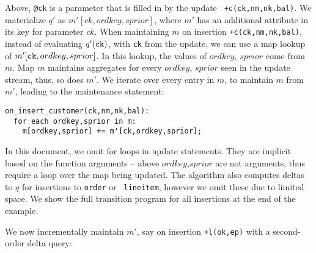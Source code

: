 {\noindent Above, {\tt @ck} is a parameter that is filled in by the update {\tt
+c(ck,nm,nk,bal)}. We materialize $q'$ as $m'[ck,ordkey,sprior]$, where $m'$ has
an additional attribute in its key for parameter $ck$. When maintaining $m$ on
insertion {\tt +c(ck,nm,nk,bal)}, instead of evaluating $q'(\mbox{{\tt ck}})$,
with {\tt ck} from the update, we can use a map lookup of $m'[\mbox{{\tt
ck}},ordkey,sprior]$. In this lookup, the values of $ordkey$, $sprior$ come from
$m$. Map $m$ maintains aggregates for every $ordkey$, $sprior$ seen in the
update stream, thus, so does $m'$. We iterate over every entry in $m$, to
maintain $m$ from $m'$, leading to the maintenance statement:

\begin{verbatim}
on_insert_customer(ck,nm,nk,bal):
  for each ordkey,sprior in m:
    m[ordkey,sprior] += m'[ck,ordkey,sprior];
\end{verbatim}

\noindent In this document, we omit for loops in update statements. They are
implicit based on the function arguments -- above $ordkey$,$sprior$ are not
arguments, thus require a loop over the map being updated.
The algorithm also computes deltas to $q$ for insertions to {\tt order} or {\tt
lineitem}, however we omit these due to limited space. We show the full
transition program for all insertions at the end of the example.

We now incrementally maintain $m'$, say on insertion {\tt +l(ok,ep)} with a
second-order delta query:


}
